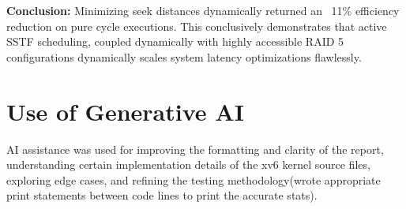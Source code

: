 \documentclass[11pt]{article}
\begin{document}
\noindent \textbf{Conclusion:} 
Minimizing seek distances dynamically returned an ~11\% efficiency reduction on pure cycle executions. This conclusively demonstrates that active SSTF scheduling, coupled dynamically with highly accessible RAID 5 configurations dynamically scales system latency optimizations flawlessly. 


\section{Use of Generative AI}
AI assistance was used for improving the formatting and clarity of the report, understanding certain implementation details of the xv6 kernel source files, exploring edge cases, and refining the testing methodology(wrote appropriate print statements between code lines to print the accurate stats).
\end{document}
